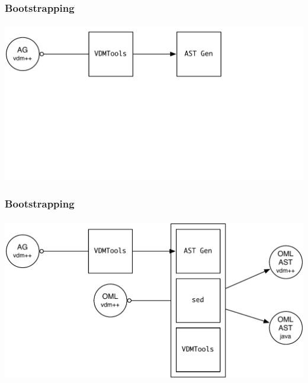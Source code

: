 \documentclass[slidestop,uncompress,mathserif,notes]{beamer}
\begin{document}
\begin{frame}[c]
  \frametitle{Bootstrapping}
  \framesubtitle{}


  \begin{center}
    \includegraphics[width=\textwidth]{images/ast_gen_oml_ast_gen.pdf}
  \end{center}

\end{frame}

\begin{frame}[c]
  \frametitle{Bootstrapping}
  \framesubtitle{}


  \begin{center}
    \includegraphics[width=\textwidth]{images/ast_gen_oml_ast_gen_2.pdf}
  \end{center}

\end{frame}
\end{document}
